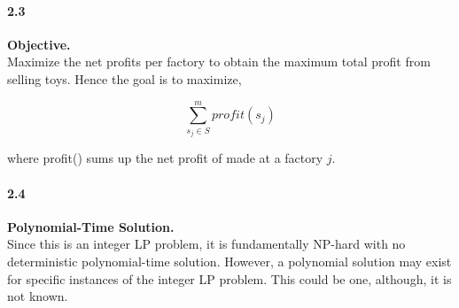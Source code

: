 \documentclass{article}
\begin{document}
\paragraph*{2.3} \textbf{Objective.} \\

\noindent
Maximize the net profits per factory to obtain the maximum total profit from selling toys.
Hence the goal is to maximize,

$$\sum_{s_j \in S}^{m} profit(s_j)$$

where profit() sums up
the net profit of made at a factory $j$.

\paragraph*{2.4} \textbf{Polynomial-Time Solution.} \\

\noindent
Since this is an integer LP problem, it is fundamentally NP-hard with no deterministic polynomial-time solution.
However, a polynomial solution may exist for specific instances of the integer LP problem. This could be one, although, it is not known.
\end{document}
